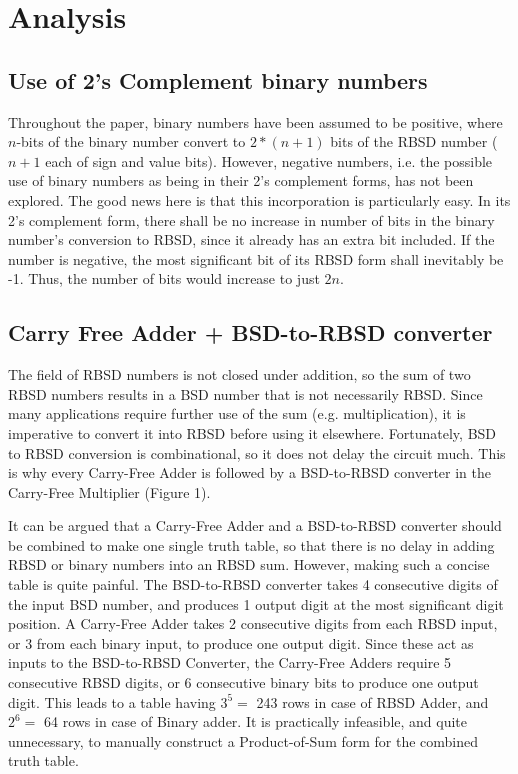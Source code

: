 \documentclass[conference]{IEEEtran_NCC}
\begin{document}
\section{Analysis}

\subsection{Use of 2's Complement binary numbers}

Throughout the paper, binary numbers have been assumed to be positive, where $n$-bits of the binary number convert to $2*(n+1)$ bits of the RBSD number ($n+1$ each of sign and value bits). However, negative numbers, i.e. the possible use of binary numbers as being in their 2's complement forms, has not been explored. The good news here is that this incorporation is particularly easy. In its 2's complement form, there shall be no increase in number of bits in the binary number's conversion to RBSD, since it already has an extra bit included. If the number is negative, the most significant bit of its RBSD form shall inevitably be -1. Thus, the number of bits would increase to just $2n$.

\subsection{Carry Free Adder + BSD-to-RBSD converter}

The field of RBSD numbers is not closed under addition, so the sum of two RBSD numbers results in a BSD number that is not necessarily RBSD. Since many applications require further use of the sum (e.g. multiplication), it is imperative to convert it into RBSD before using it elsewhere. Fortunately, BSD to RBSD conversion is combinational, so it does not delay the circuit much. This is why every Carry-Free Adder is followed by a BSD-to-RBSD converter in the Carry-Free Multiplier (Figure 1).

It can be argued that a Carry-Free Adder and a BSD-to-RBSD converter should be combined to make one single truth table, so that there is no delay in adding RBSD or binary numbers into an RBSD sum. However, making such a concise table is quite painful. The BSD-to-RBSD converter takes 4 consecutive digits of the input BSD number, and produces 1 output digit at the most significant digit position. A Carry-Free Adder takes 2 consecutive digits from each RBSD input, or 3 from each binary input, to produce one output digit. Since these act as inputs to the BSD-to-RBSD Converter, the Carry-Free Adders require 5 consecutive RBSD digits, or 6 consecutive binary bits to produce one output digit. This leads to a table having $3^5 =$ 243 rows in case of RBSD Adder, and $2^6 =$ 64 rows in case of Binary adder. It is practically infeasible, and quite unnecessary, to manually construct a Product-of-Sum form for the combined truth table.
\end{document}
